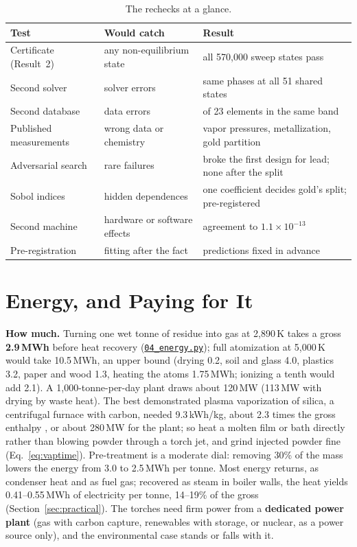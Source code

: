 \documentclass[11pt,a4paper]{article}
\newcommand{\gh}[2]{\href{https://github.com/syncaissa/paramanu-reclaimer/blob/main/#1}{\texttt{#2}}}
\theoremstyle{definition}
\theoremstyle{plain}
\theoremstyle{remark}
\begin{document}
\begin{table}[!htbp]
\centering
\caption{The rechecks at a glance.}\label{tab:verification}
\footnotesize
\begin{tabular}{@{}>{\raggedright\arraybackslash}p{3.4cm}>{\raggedright\arraybackslash}p{4.0cm}>{\raggedright\arraybackslash}p{6.4cm}@{}}
\toprule
\textbf{Test} & \textbf{Would catch} & \textbf{Result} \\
\midrule
Certificate (Result~2) & any non-equilibrium state & all 570,000 sweep states pass \\
Second solver & solver errors & same phases at all 51 shared states \\
Second database & data errors & 21 of 23 elements in the same band \\
Published measurements & wrong data or chemistry & vapor pressures, metallization, gold partition \\
Adversarial search & rare failures & broke the first design for lead; none after the split \\
Sobol indices & hidden dependences & one coefficient decides gold's split; pre-registered \\
Second machine & hardware or software effects & agreement to $1.1\times10^{-13}$ \\
Pre-registration & fitting after the fact & 13 predictions fixed in advance \\
\bottomrule
\end{tabular}
\end{table}

\section{Energy, and Paying for It}\label{sec:energy}

\textbf{How much.} Turning one wet tonne of residue into gas at 2,890\,K takes a gross \textbf{2.9\,MWh} before heat recovery (\gh{simulation/scripts/04_energy.py}{04\_energy.py}); full atomization at 5,000\,K would take 10.5\,MWh, an upper bound (drying 0.2, soil and glass 4.0, plastics 3.2, paper and wood 1.3, heating the atoms 1.75\,MWh; ionizing a tenth would add 2.1). A 1,000-tonne-per-day plant draws about 120\,MW (113\,MW with drying by waste heat). The best demonstrated plasma vaporization of silica, a centrifugal furnace with carbon, needed 9.3\,kWh/kg, about 2.3 times the gross enthalpy \citep{sayce1976}, or about 280\,MW for the plant; so heat a molten film or bath directly rather than blowing powder through a torch jet, and grind injected powder fine (Eq.~\ref{eq:vaptime}). Pre-treatment is a moderate dial: removing 30\% of the mass lowers the energy from 3.0 to 2.5\,MWh per tonne. Most energy returns, as condenser heat and as fuel gas; recovered as steam in boiler walls, the heat yields 0.41--0.55\,MWh of electricity per tonne, 14--19\% of the gross (Section~\ref{sec:practical}). The torches need firm power from a \textbf{dedicated power plant} (gas with carbon capture, renewables with storage, or nuclear, as a power source only), and the environmental case stands or falls with it.
\end{document}
